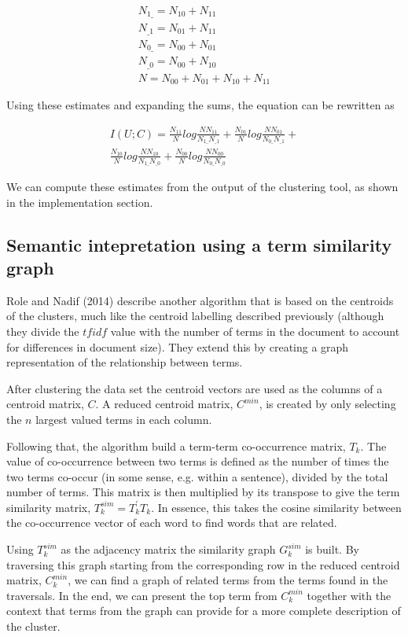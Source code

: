 \documentclass[letterpaper, 10 pt, conference]{ieeeconf}
\begin{document}
\begin{gather*}
N_{1\_} = N_{10} + N_{11} \\
N_{\_1} = N_{01} + N_{11} \\
N_{0\_} = N_{00} + N_{01} \\
N_{\_0} = N_{00} + N_{10} \\
N = N_{00} + N_{01} + N_{10} + N_{11}
\end{gather*}

Using these estimates and expanding the sums, the equation can be rewritten as

\begin{align*}
I(U;C) = \frac{N_{11}}{N} log \frac{NN_{11}}{N_{1\_}N_{\_1}} + \frac{N_{01}}{N} log \frac{NN_{01}}{N_{0\_}N_{\_1}} + \\
\frac{N_{10}}{N} log \frac{NN_{10}}{N_{1\_}N_{\_0}} + \frac{N_{00}}{N} log \frac{NN_{00}}{N_{0\_}N_{\_0}}
\end{align*}

We can compute these estimates from the output of the clustering tool, as shown
in the implementation section.

\subsection{Semantic intepretation using a term similarity graph}
Role and Nadif (2014) describe another algorithm that is based on the centroids
of the clusters, much like the centroid labelling described previously
(although they divide the $tfidf$ value with the number of terms in the document
to account for differences in document size). They extend this by creating a
graph representation of the relationship between terms.\cite{role2014beyond}

After clustering the data set the centroid vectors are used as the columns of a
centroid matrix, $C$. A reduced centroid matrix, $C^{min}$, is created by only
selecting the $n$ largest valued terms in each column.

Following that, the algorithm build a term-term co-occurrence matrix, $T_k$.
The value of co-occurrence between two terms is defined as the number of times
the two terms co-occur (in some sense, e.g. within a sentence), divided by the
total number of terms. This matrix is then multiplied by its transpose to give
the term similarity matrix, $T^{sim}_k = T^\prime_k T_k$. In essence, this takes
the cosine similarity between the co-occurrence vector of each word to find
words that are related.

Using $T^{sim}_k$ as the adjacency matrix the similarity graph $G^{sim}_k$ is
built. By traversing this graph starting from the corresponding row in the
reduced centroid matrix, $C^{min}_k$, we can find a graph of related terms from
the terms found in the traversals. In the end, we can present the top term
from $C^{min}_k$ together with the context that terms from the graph can provide
for a more complete description of the cluster.
\end{document}

